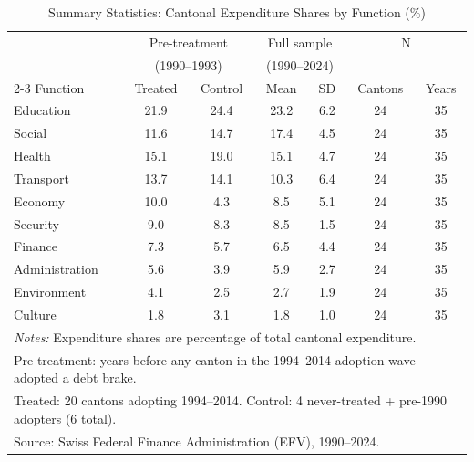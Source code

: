 \begin{table}[htbp]
\centering
\caption{Summary Statistics: Cantonal Expenditure Shares by Function (\%)}
\label{tab:summary}
\begin{tabular}{lcccccc}
\hline\hline
 & \multicolumn{2}{c}{Pre-treatment} & \multicolumn{2}{c}{Full sample} & \multicolumn{2}{c}{N} \\
 & \multicolumn{2}{c}{(1990--1993)} & \multicolumn{2}{c}{(1990--2024)} & & \\
\cline{2-3} \cline{4-5}
Function & Treated & Control & Mean & SD & Cantons & Years \\
\hline
Education & 21.9 & 24.4 & 23.2 & 6.2 & 24 & 35 \\
Social & 11.6 & 14.7 & 17.4 & 4.5 & 24 & 35 \\
Health & 15.1 & 19.0 & 15.1 & 4.7 & 24 & 35 \\
Transport & 13.7 & 14.1 & 10.3 & 6.4 & 24 & 35 \\
Economy & 10.0 & 4.3 & 8.5 & 5.1 & 24 & 35 \\
Security & 9.0 & 8.3 & 8.5 & 1.5 & 24 & 35 \\
Finance & 7.3 & 5.7 & 6.5 & 4.4 & 24 & 35 \\
Administration & 5.6 & 3.9 & 5.9 & 2.7 & 24 & 35 \\
Environment & 4.1 & 2.5 & 2.7 & 1.9 & 24 & 35 \\
Culture & 1.8 & 3.1 & 1.8 & 1.0 & 24 & 35 \\
\hline
\multicolumn{7}{l}{\footnotesize \textit{Notes:} Expenditure shares are percentage of total cantonal expenditure.} \\
\multicolumn{7}{l}{\footnotesize Pre-treatment: years before any canton in the 1994--2014 adoption wave adopted a debt brake.} \\
\multicolumn{7}{l}{\footnotesize Treated: 20 cantons adopting 1994--2014. Control: 4 never-treated + pre-1990 adopters (6 total).} \\
\multicolumn{7}{l}{\footnotesize Source: Swiss Federal Finance Administration (EFV), 1990--2024.} \\
\hline\hline
\end{tabular}
\end{table}
